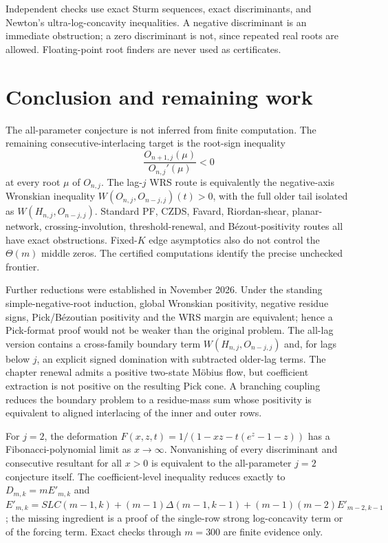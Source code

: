 \documentclass[11pt]{article}
\theoremstyle{definition}
\newcommand{\OO}{O}
\begin{document}
Independent checks use exact Sturm sequences, exact discriminants, and
Newton's ultra-log-concavity inequalities.  A negative discriminant is an
immediate obstruction; a zero discriminant is not, since repeated real roots
are allowed.  Floating-point root finders are never used as certificates.



\section{Conclusion and remaining work}
The all-parameter conjecture is not inferred from finite computation. The
remaining consecutive-interlacing target is the root-sign inequality
\[
\frac{\OO_{n+1,j}(\mu)}{\OO_{n,j}'(\mu)}<0
\]
at every root \(\mu\) of \(\OO_{n,j}\). The lag-\(j\) WRS route is equivalently
the negative-axis Wronskian inequality
\(W(\OO_{n,j},\OO_{n-j,j})(t)>0\), with the full older tail isolated as
\(W(H_{n,j},\OO_{n-j,j})\). Standard PF, CZDS, Favard, Riordan-shear,
planar-network, crossing-involution, threshold-renewal, and Bézout-positivity
routes all have exact obstructions. Fixed-\(K\) edge asymptotics also do not
control the \(\Theta(m)\) middle zeros. The certified computations identify
the precise unchecked frontier.

Further reductions were established in November 2026. Under the standing
simple-negative-root induction, global Wronskian positivity, negative residue
signs, Pick/B\'ezoutian positivity and the WRS margin are equivalent; hence a
Pick-format proof would not be weaker than the original problem. The all-lag
version contains a cross-family boundary term
\(W(H_{n,j},O_{n-j,j})\) and, for lags below \(j\), an explicit signed
domination with subtracted older-lag terms. The chapter renewal admits a
positive two-state M\"obius flow, but coefficient extraction is not positive
on the resulting Pick cone. A branching coupling reduces the boundary problem
to a residue-mass sum whose positivity is equivalent to aligned interlacing of
the inner and outer rows.

For \(j=2\), the deformation
\(F(x,z,t)=1/(1-xz-t(e^z-1-z))\) has a Fibonacci-polynomial limit as
\(x\to\infty\). Nonvanishing of every discriminant and consecutive resultant
for all \(x>0\) is equivalent to the all-parameter \(j=2\) conjecture itself.
The coefficient-level inequality reduces exactly to
\(D_{m,k}=mE'_{m,k}\) and
\(E'_{m,k}=SLC(m-1,k)+(m-1)\Delta(m-1,k-1)+(m-1)(m-2)E'_{m-2,k-1}\);
the missing ingredient is a proof of the single-row strong log-concavity term
or of the forcing term. Exact checks through \(m=300\) are finite evidence
only.
\end{document}
